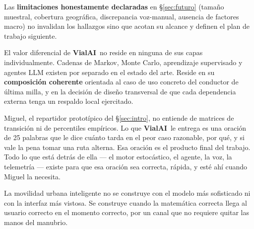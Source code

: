 \documentclass[11pt,a4paper]{article}
\newcommand{\VialAI}{\textbf{\textcolor{vialTeal}{Vial}\textcolor{vialAmber}{AI}}}
\begin{document}
Las \textbf{limitaciones honestamente declaradas} en
\S\ref{sec:futuro} (tamaño muestral, cobertura geográfica,
discrepancia voz-manual, ausencia de factores macro) no
invalidan los hallazgos sino que acotan su alcance y definen el
plan de trabajo siguiente.

El valor diferencial de \VialAI\ no reside en ninguna de sus
capas individualmente. Cadenas de Markov, Monte Carlo,
aprendizaje supervisado y agentes LLM existen por separado en
el estado del arte. Reside en su \textbf{composición coherente}
orientada al caso de uso concreto del conductor de última milla,
y en la decisión de diseño transversal de que cada dependencia
externa tenga un respaldo local ejercitado.

Miguel, el repartidor prototípico del \S\ref{sec:intro}, no
entiende de matrices de transición ni de percentiles empíricos.
Lo que \VialAI\ le entrega es una oración de \num{25} palabras
que le dice cuánto tarda en el peor caso razonable, por qué, y
si vale la pena tomar una ruta alterna. Esa oración es el
producto final del trabajo. Todo lo que está detrás de ella ---
el motor estocástico, el agente, la voz, la telemetría --- existe
para que esa oración sea correcta, rápida, y esté ahí cuando
Miguel la necesita.

\begin{tipbox}[Cierre]
La movilidad urbana inteligente no se construye con el modelo
más sofisticado ni con la interfaz más vistosa. Se construye
cuando la matemática correcta llega al usuario correcto en el
momento correcto, por un canal que no requiere quitar las manos
del manubrio.
\end{tipbox}
\end{document}
